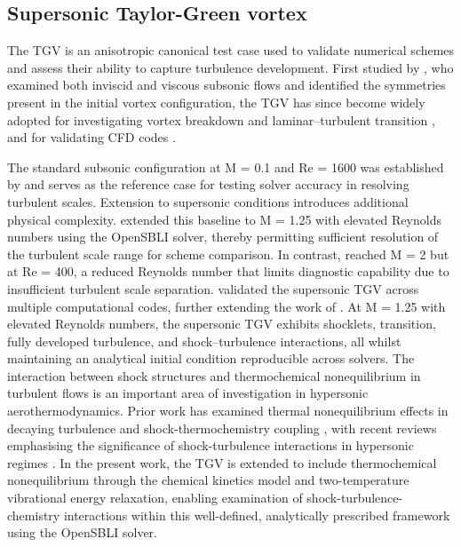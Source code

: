 \subsection{Supersonic Taylor-Green vortex}

The \gls{TGV} is an anisotropic canonical test case used to validate numerical schemes and assess their ability to capture turbulence development. First studied by \citep{BrachetEtAl1983}, who examined both inviscid and viscous subsonic flows and identified the symmetries present in the initial vortex configuration, the \gls{TGV} has since become widely adopted for investigating vortex breakdown and laminar--turbulent transition \citep{PengYang2018,SharmaSengupta2019}, and for validating CFD codes \citep{BullJameson2015,HoubaEtAl2019}.

The standard subsonic configuration at M = 0.1 and Re = 1600 was established by \cite{DeBonis2013} and serves as the reference case for testing solver accuracy in resolving turbulent scales. Extension to supersonic conditions introduces additional physical complexity. \cite{LusherSandham2021} extended this baseline to M = 1.25 with elevated Reynolds numbers using the OpenSBLI solver, thereby permitting sufficient resolution of the turbulent scale range for scheme comparison. In contrast, \cite{PengYang2018} reached M = 2 but at Re = 400, a reduced Reynolds number that limits diagnostic capability due to insufficient turbulent scale separation. \cite{ChapelierEtAl2024} validated the supersonic \gls{TGV} across multiple computational codes, further extending the work of \cite{LusherSandham2021}. At M = 1.25 with elevated Reynolds numbers, the supersonic \gls{TGV} exhibits shocklets, transition, fully developed turbulence, and shock--turbulence interactions, all whilst maintaining an analytical initial condition reproducible across solvers. The interaction between shock structures and thermochemical nonequilibrium in turbulent flows is an important area of investigation in hypersonic aerothermodynamics. Prior work has examined thermal nonequilibrium effects in decaying turbulence \citep{NevilleEtAl2014} and shock-thermochemistry coupling \citep{HueteEtAl2021}, with recent reviews emphasising the significance of shock-turbulence interactions in hypersonic regimes \citep{CuadraEtAl2025}. In the present work, the \gls{TGV} is extended to include thermochemical nonequilibrium through the \citep{Park1990} chemical kinetics model and two-temperature vibrational energy relaxation, enabling examination of shock-turbulence-chemistry interactions within this well-defined, analytically prescribed framework using the OpenSBLI solver.

